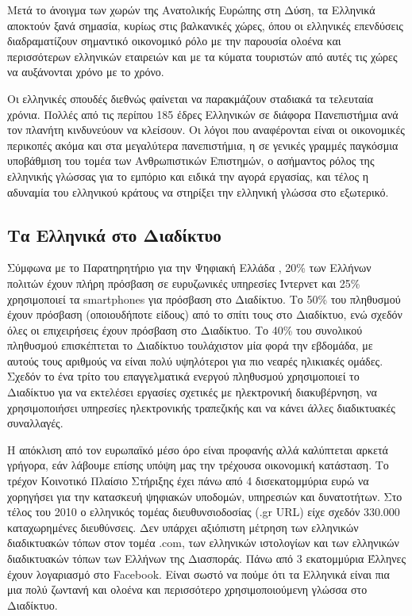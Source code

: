 \documentclass[]{../../metanetpaper}
\begin{document}
\begin{multicols}{2}
Μετά το άνοιγμα των χωρών της Ανατολικής Ευρώπης στη Δύση, τα Ελληνικά αποκτούν ξανά σημασία, κυρίως στις βαλκανικές χώρες, όπου οι ελληνικές επενδύσεις διαδραματίζουν σημαντικό οικονομικό ρόλο με την παρουσία ολοένα και περισσότερων ελληνικών εταιρειών και με τα κύματα τουριστών από αυτές τις χώρες να αυξάνονται χρόνο με το χρόνο.

Οι ελληνικές σπουδές διεθνώς φαίνεται να παρακμάζουν σταδιακά τα τελευταία χρόνια. Πολλές από τις περίπου 185 έδρες Ελληνικών σε διάφορα Πανεπιστήμια ανά τον πλανήτη κινδυνεύουν να κλείσουν. Οι λόγοι που αναφέρονται είναι οι οικονομικές περικοπές ακόμα και στα μεγαλύτερα πανεπιστήμια, η σε γενικές γραμμές παγκόσμια υποβάθμιση του τομέα των Ανθρωπιστικών Επιστημών, ο ασήμαντος ρόλος της ελληνικής γλώσσας για το εμπόριο και ειδικά την αγορά εργασίας, και τέλος η αδυναμία του ελληνικού κράτους να στηρίξει την ελληνική γλώσσα στο εξωτερικό.

\subsection{Τα Ελληνικά στο Διαδίκτυο}

Σύμφωνα με το Παρατηρητήριο για την Ψηφιακή Ελλάδα \cite{Obs1}, 20\% των Ελλήνων πολιτών έχουν πλήρη πρόσβαση σε ευρυζωνικές υπηρεσίες Ίντερνετ και 25\% χρησιμοποιεί τα smartphones για πρόσβαση στο Διαδίκτυο. Το 50\% του πληθυσμού έχουν πρόσβαση (οποιουδήποτε είδους) από το σπίτι τους στο Διαδίκτυο, ενώ σχεδόν όλες οι επιχειρήσεις έχουν πρόσβαση στο Διαδίκτυο. Το 40\% του συνολικού πληθυσμού  επισκέπτεται το Διαδίκτυο τουλάχιστον μία φορά την εβδομάδα, με αυτούς τους αριθμούς να είναι πολύ υψηλότεροι για πιο νεαρές ηλικιακές ομάδες. Σχεδόν το ένα τρίτο του επαγγελματικά ενεργού πληθυσμού χρησιμοποιεί το Διαδίκτυο για να εκτελέσει εργασίες σχετικές με ηλεκτρονική διακυβέρνηση, να χρησιμοποιήσει υπηρεσίες ηλεκτρονικής τραπεζικής και να κάνει άλλες διαδικτυακές συναλλαγές.

Η απόκλιση από τον ευρωπαϊκό μέσο όρο είναι προφανής αλλά καλύπτεται αρκετά γρήγορα, εάν λάβουμε επίσης υπόψη μας την τρέχουσα οικονομική κατάσταση. Το τρέχον Κοινοτικό Πλαίσιο Στήριξης έχει πάνω από 4 δισεκατομμύρια ευρώ να χορηγήσει για την κατασκευή ψηφιακών υποδομών, υπηρεσιών και δυνατοτήτων.
Στο τέλος του 2010 ο ελληνικός τομέας διευθυνσιοδοσίας (.gr URL) είχε σχεδόν 330.000 καταχωρημένες διευθύνσεις. Δεν υπάρχει αξιόπιστη μέτρηση των ελληνικών διαδικτυακών τόπων στον τομέα .com, των ελληνικών ιστολογίων και των ελληνικών διαδικτυακών τόπων των Ελλήνων της Διασποράς. Πάνω από 3 εκατομμύρια Έλληνες έχουν λογαριασμό στο Facebook. Είναι σωστό να πούμε ότι τα Ελληνικά είναι πια μια πολύ ζωντανή και ολοένα και περισσότερο χρησιμοποιούμενη γλώσσα στο Διαδίκτυο.


\end{multicols}
\end{document}
